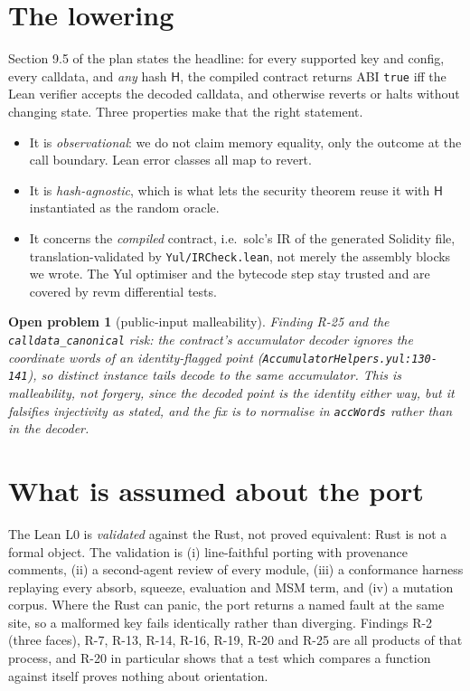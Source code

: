 \documentclass[11pt]{article}
\newtheorem{open}[theorem]{Open problem}
\newcommand{\Hash}{\mathsf{H}}
\begin{document}
\section{The lowering}\label{sec:lowering}

Section 9.5 of the plan states the headline: for every supported key and config,
every calldata, and \emph{any} hash $\Hash$, the compiled contract returns ABI
\texttt{true} iff the Lean verifier accepts the decoded calldata, and otherwise
reverts or halts without changing state. Three properties make that the right
statement.
\begin{itemize}
\item It is \emph{observational}: we do not claim memory equality, only the outcome
at the call boundary. Lean error classes all map to revert.
\item It is \emph{hash-agnostic}, which is what lets the security theorem reuse it
with $\Hash$ instantiated as the random oracle.
\item It concerns the \emph{compiled} contract, i.e.\ solc's IR of the generated
Solidity file, translation-validated by \texttt{Yul/IRCheck.lean}, not merely the
assembly blocks we wrote. The Yul optimiser and the bytecode step stay trusted and
are covered by revm differential tests.
\end{itemize}

\begin{open}[public-input malleability]\label{op:mal}
Finding R-25 and the \texttt{calldata\_canonical} risk: the contract's accumulator
decoder ignores the coordinate words of an identity-flagged point
(\texttt{AccumulatorHelpers.yul:130-141}), so distinct instance tails decode to the
same accumulator. This is malleability, not forgery, since the decoded point is the
identity either way, but it falsifies injectivity as stated, and the fix is to
normalise in \texttt{accWords} rather than in the decoder.
\end{open}

\section{What is assumed about the port}\label{sec:port}

The Lean L0 is \emph{validated} against the Rust, not proved equivalent: Rust is not
a formal object. The validation is (i) line-faithful porting with provenance
comments, (ii) a second-agent review of every module, (iii) a conformance harness
replaying every absorb, squeeze, evaluation and MSM term, and (iv) a mutation
corpus. Where the Rust can panic, the port returns a named fault at the same site,
so a malformed key fails identically rather than diverging. Findings R-2 (three
faces), R-7, R-13, R-14, R-16, R-19, R-20 and R-25 are all products of that process,
and R-20 in particular shows that a test which compares a function against itself
proves nothing about orientation.
\end{document}
